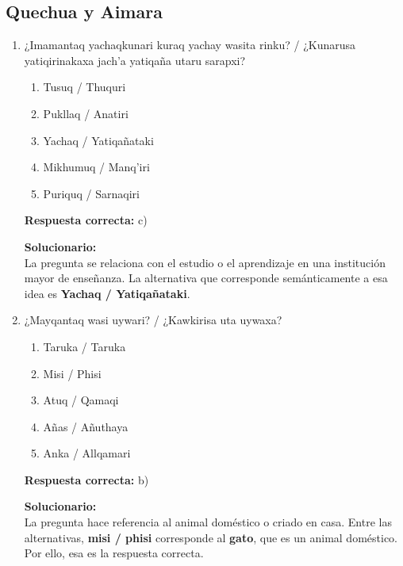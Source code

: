\subsection*{Quechua y Aimara}

\begin{enumerate}
	
	\item ¿Imamantaq yachaqkunari kuraq yachay wasita rinku? / ¿Kunarusa yatiqirinakaxa jach'a yatiqaña utaru sarapxi?
	\begin{enumerate}[label=\alph*)]
		\item Tusuq / Thuquri
		\item Pukllaq / Anatiri
		\item Yachaq / Yatiqañataki
		\item Mikhumuq / Manq'iri
		\item Puriquq / Sarnaqiri
	\end{enumerate}
	\textbf{Respuesta correcta:} c)
	
	\vspace{2mm}
	\textbf{Solucionario:}\\
	La pregunta se relaciona con el estudio o el aprendizaje en una institución mayor de enseñanza. La alternativa que corresponde semánticamente a esa idea es \textbf{Yachaq / Yatiqañataki}.
	
	\vspace{6mm}
	
	\item ¿Mayqantaq wasi uywari? / ¿Kawkirisa uta uywaxa?
	\begin{enumerate}[label=\alph*)]
		\item Taruka / Taruka
		\item Misi / Phisi
		\item Atuq / Qamaqi
		\item Añas / Añuthaya
		\item Anka / Allqamari
	\end{enumerate}
	\textbf{Respuesta correcta:} b)
	
	\vspace{2mm}
	\textbf{Solucionario:}\\
	La pregunta hace referencia al animal doméstico o criado en casa. Entre las alternativas, \textbf{misi / phisi} corresponde al \textbf{gato}, que es un animal doméstico. Por ello, esa es la respuesta correcta.
	
	\vspace{6mm}
	
\end{enumerate}






